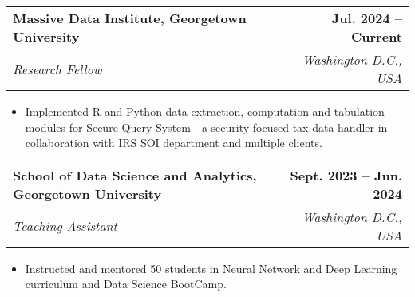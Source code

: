 \documentclass[letterpaper,11pt]{article}
\makeatletter
\newcommand{\resumeItem}[1]{
  \item\small{
    {#1 \vspace{-2pt}}
  }
}
\newcommand{\resumeSubheading}[4]{
  \vspace{-2pt}\item
    \begin{tabular*}{1.0\textwidth}[t]{l@{\extracolsep{\fill}}r}
      \textbf{#1} & \textbf{\small #2} \\
      \textit{\small#3} & \textit{\small #4} \\
    \end{tabular*}\vspace{-7pt}
}
\newcommand{\resumeItemListStart}{\begin{itemize}}
\newcommand{\resumeItemListEnd}{\end{itemize}\vspace{-5pt}}
\makeatother
\begin{document}
    \resumeSubheading
    {Massive Data Institute, Georgetown University}{Jul. 2024 -- Current}
    {Research Fellow}{Washington D.C., USA}
      \resumeItemListStart
        \resumeItem{Implemented R and Python data extraction, computation and tabulation modules for Secure Query System - a security-focused tax data handler in collaboration with IRS SOI department and multiple clients. }
      \resumeItemListEnd
    \resumeSubheading
      {School of Data Science and Analytics, Georgetown University}{Sept. 2023 -- Jun. 2024}
      {Teaching Assistant}{Washington D.C., USA}
      \resumeItemListStart
        \resumeItem{Instructed and mentored 50 students in Neural Network and Deep Learning curriculum and Data Science BootCamp.}
    \resumeItemListEnd
\end{document}
